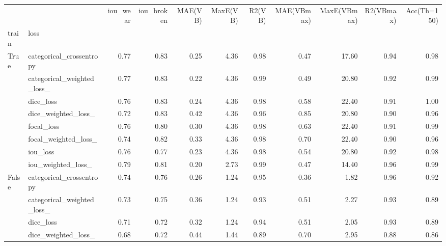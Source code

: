 \begin{tabular}{llrrrrrrrrr}
\toprule
      &                    &  iou\_wear &  iou\_broken &  MAE(VB) &  MaxE(VB) &  R2(VB) &  MAE(VBmax) &  MaxE(VBmax) &  R2(VBmax) &  Acc(Th=150) \\
train & loss &           &             &          &           &         &             &              &            &              \\
\midrule
True  & categorical\_crossentropy &      0.77 &        0.83 &     0.25 &      4.36 &    0.98 &        0.47 &        17.60 &       0.94 &         0.98 \\
      & categorical\_weighted\_loss\_ &      0.77 &        0.83 &     0.22 &      4.36 &    0.99 &        0.49 &        20.80 &       0.92 &         0.99 \\
      & dice\_loss &      0.76 &        0.83 &     0.24 &      4.36 &    0.98 &        0.58 &        22.40 &       0.91 &         1.00 \\
      & dice\_weighted\_loss\_ &      0.72 &        0.83 &     0.42 &      4.36 &    0.96 &        0.85 &        20.80 &       0.90 &         0.96 \\
      & focal\_loss &      0.76 &        0.80 &     0.30 &      4.36 &    0.98 &        0.63 &        22.40 &       0.91 &         0.99 \\
      & focal\_weighted\_loss\_ &      0.74 &        0.82 &     0.33 &      4.36 &    0.98 &        0.70 &        22.40 &       0.90 &         0.96 \\
      & iou\_loss &      0.76 &        0.77 &     0.23 &      4.36 &    0.98 &        0.54 &        20.80 &       0.92 &         0.98 \\
      & iou\_weighted\_loss\_ &      0.79 &        0.81 &     0.20 &      2.73 &    0.99 &        0.47 &        14.40 &       0.96 &         0.99 \\
False & categorical\_crossentropy &      0.74 &        0.76 &     0.26 &      1.24 &    0.95 &        0.36 &         1.82 &       0.96 &         0.92 \\
      & categorical\_weighted\_loss\_ &      0.73 &        0.75 &     0.36 &      1.24 &    0.93 &        0.51 &         2.27 &       0.93 &         0.89 \\
      & dice\_loss &      0.71 &        0.72 &     0.32 &      1.24 &    0.94 &        0.51 &         2.05 &       0.93 &         0.89 \\
      & dice\_weighted\_loss\_ &      0.68 &        0.72 &     0.44 &      1.44 &    0.89 &        0.70 &         2.95 &       0.88 &         0.86 \\

\end{tabular}
